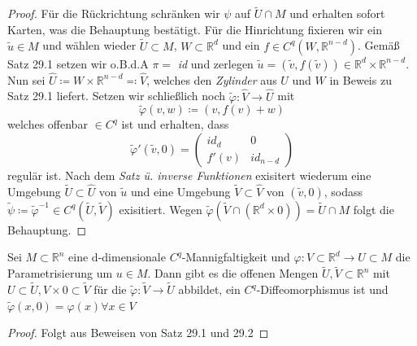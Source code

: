 \begin{proof}
Für die Rückrichtung schränken wir $\psi $ auf $\tilde{U} \cap M $ und erhalten sofort Karten, was die Behauptung bestätigt. Für die Hinrichtung fixieren wir ein $\tilde{u} \in M $ und wählen wieder $\tilde{U} \subset M $, $W \subset \mathbb{R}^d $ und ein $f \in C^q \left( W, \mathbb{R}^{n-d} \right)$. Gemäß Satz 29.1 setzen wir o.B.d.A $\pi = $ \textit{id} und zerlegen $\tilde{u} = \left( \tilde{v}, f \left( \tilde{v} \right) \right) \in \mathbb{R}^d \times \mathbb{R}^{n-d}$. Nun sei $\hat{U} \coloneqq W \times \mathbb{R}^{n-d} \eqqcolon \hat{V} $, welches den \emph{Zylinder} aus $U$ und $W$ in Beweis zu Satz 29.1 liefert.
Setzen wir schließlich noch $\tilde{\varphi}: \hat{V} \rightarrow \hat{U} $ mit
\begin{equation*}
\tilde{\varphi} (v,w) \coloneqq (v, f(v) + w)
\end{equation*}
welches offenbar $\in C^q$ ist und erhalten, dass
\begin{equation*}
\tilde{\varphi}' \left( \tilde{v}, 0 \right) =
    \begin{pmatrix}
    \textit{id}_d & 0 \\
    f'(v)         & \textit{id}_{n-d}
    \end{pmatrix}
\end{equation*}
regulär ist. Nach dem \emph{Satz ü. inverse Funktionen} exisitert wiederum eine Umgebung $ \tilde{U} \subset \hat{U}$ von $\tilde{u}$ und eine Umgebung $ \tilde{V} \subset \hat{V} $ von $ \left( \tilde{v}, 0 \right) $, sodass $\tilde{\psi} \coloneqq \tilde{\varphi}^{-1} \in C^q \left( \tilde{U}, \tilde{V} \right) $
exisitiert. Wegen $\tilde{\varphi} \left( \tilde{V} \cap \left( \mathbb{R}^d \times {0} \right) \right)
= \tilde{U} \cap M $ folgt die Behauptung.
\end{proof}

\begin{folgerung}
Sei $M \subset \mathbb{R}^n$ eine d-dimensionale $C^q$-Mannigfaltigkeit und $\varphi: V \subset \mathbb{R}^d \rightarrow U \subset M $ die Parametrisierung um $u \in M $. Dann gibt es die offenen Mengen $\tilde{U}, \tilde{V} \subset \mathbb{R}^n $ mit $ U \subset \tilde{U}, V \times {0} \subset \tilde{V} $ für die $\tilde{\varphi} : \tilde{V} \rightarrow \tilde{U} $ abbildet, ein $C^q$-Diffeomorphismus ist und $\tilde{\varphi} (x, 0) = \varphi (x) \forall x \in V $
\end{folgerung}

\begin{proof}
Folgt aus Beweisen von Satz 29.1 und 29.2
\end{proof}

